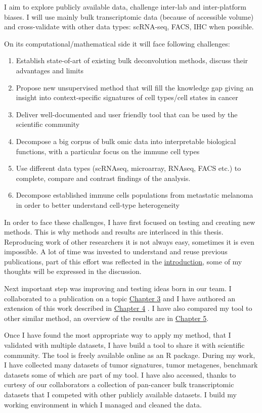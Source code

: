 \documentclass[12pt,]{book}
\providecommand{\tightlist}{%
  \setlength{\itemsep}{0pt}\setlength{\parskip}{0pt}}
\theoremstyle{definition}
\theoremstyle{definition}
\theoremstyle{definition}
\theoremstyle{remark}
\begin{document}
I aim to explore publicly available data, challenge inter-lab and
inter-platform biases. I will use mainly bulk transcriptomic data
(because of accessible volume) and cross-validate with other data types:
scRNA-seq, FACS, IHC when possible.

On its computational/mathematical side it will face following
challenges:

\begin{enumerate}
\def\labelenumi{\arabic{enumi}.}
\tightlist
\item
  Establish state-of-art of existing bulk deconvolution methods, discuss
  their advantages and limits
\item
  Propose new unsupervised method that will fill the knowledge gap
  giving an insight into context-specific signatures of cell types/cell
  states in cancer
\item
  Deliver well-documented and user friendly tool that can be used by the
  scientific community
\item
  Decompose a big corpus of bulk omic data into interpretable biological
  functions, with a particular focus on the immune cell types
\item
  Use different data types (scRNAseq, microarray, RNAseq, FACS etc.) to
  complete, compare and contrast findings of the analysis.
\item
  Decompose established immune cells populations from metastatic
  melanoma in order to better understand cell-type heterogeneity
\end{enumerate}

In order to face these challenges, I have first focused on testing and
creating new methods. This is why methods and results are interlaced in
this thesis. Reproducing work of other researchers it is not always
easy, sometimes it is even impossible. A lot of time was invested to
understand and reuse previous publications, part of this effort was
reflected in the \protect\hyperlink{methods}{introduction}, some of my
thoughts will be expressed in the discussion.

Next important step was improving and testing ideas born in our team. I
collaborated to a publication on a topic
\protect\hyperlink{MSTD}{Chapter 3} and I have authored an extension of
this work described in \protect\hyperlink{lva}{Chapter 4} . I have also
compared my tool to other similar method, an overview of the results are
in \protect\hyperlink{nmf}{Chapter 5}.

Once I have found the most appropriate way to apply my method, that I
validated with multiple datasets, I have build a tool to share it with
scientific community. The tool is freely available online as an R
package. During my work, I have collected many datasets of tumor
signatures, tumor metagenes, benchmark datasets some of which are part
of my tool. I have also accessed, thanks to curtesy of our collaborators
a collection of pan-cancer bulk transcriptomic datasets that I competed
with other publicly available datasets. I build my working environment
in which I managed and cleaned the data.
\end{document}

